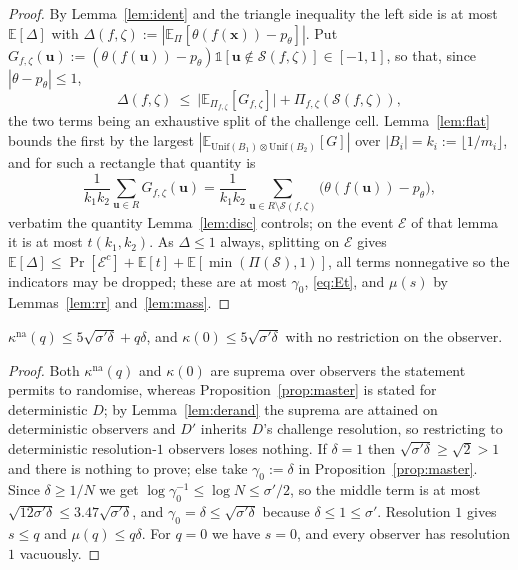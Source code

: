 \documentclass{aicr-solution}
\newcommand{\Prob}[1]{\Pr\!\left[#1\right]}
\newcommand{\Exp}{\mathbb{E}}
\newcommand{\vx}{\mathbf{x}}
\newcommand{\vu}{\mathbf{u}}
\newcommand{\ind}{\mathbb{1}}
\newcommand{\Unif}{\mathrm{Unif}}
\newcommand{\kna}{\kappa^{\mathrm{na}}}
\begin{document}
\begin{proof}
By Lemma~\ref{lem:ident} and the triangle inequality the left side is at most
$\Exp[\Delta]$ with
$\Delta(f,\zeta):=|\Exp_{\Pi}[\theta(f(\vx))-p_\theta]|$. Put
$G_{f,\zeta}(\vu):=(\theta(f(\vu))-p_\theta)\ind[\vu\notin\mathcal S(f,\zeta)]\in[-1,1]$,
so that, since $|\theta-p_\theta|\le1$,
\[
  \Delta(f,\zeta)\ \le\ \bigl|\Exp_{\Pi_{f,\zeta}}[G_{f,\zeta}]\bigr|
  +\Pi_{f,\zeta}(\mathcal S(f,\zeta)),
\]
the two terms being an exhaustive split of the challenge cell. Lemma~\ref{lem:flat}
bounds the first by the largest $|\Exp_{\Unif(B_1)\otimes\Unif(B_2)}[G]|$ over
$|B_i|=k_i:=\lfloor1/m_i\rfloor$, and for such a rectangle that quantity is
\[
  \frac{1}{k_1k_2}\sum_{\vu\in R}G_{f,\zeta}(\vu)
  =\frac{1}{k_1k_2}\sum_{\vu\in R\setminus\mathcal S(f,\zeta)}\bigl(\theta(f(\vu))-p_\theta\bigr),
\]
verbatim the quantity Lemma~\ref{lem:disc} controls; on the event $\mathcal E$ of
that lemma it is at most $t(k_1,k_2)$. As $\Delta\le1$ always, splitting on
$\mathcal E$ gives
$\Exp[\Delta]\le\Prob{\mathcal E^{c}}+\Exp[t]+\Exp[\min(\Pi(\mathcal S),1)]$, all
terms nonnegative so the indicators may be dropped; these are at most
$\gamma_0$, \eqref{eq:Et}, and $\mu(s)$ by Lemmas~\ref{lem:rr} and~\ref{lem:mass}.
\end{proof}

\begin{theorem}\label{thm:A}
$\kna(q)\le5\sqrt{\sigma'\delta}+q\delta$, and
$\kappa(0)\le5\sqrt{\sigma'\delta}$ with no restriction on the observer.
\end{theorem}

\begin{proof}
Both $\kna(q)$ and $\kappa(0)$ are suprema over observers the statement permits
to randomise, whereas Proposition~\ref{prop:master} is stated for deterministic
$D$; by Lemma~\ref{lem:derand} the suprema are attained on deterministic
observers and $D'$ inherits $D$'s challenge resolution, so restricting to
deterministic resolution-$1$ observers loses nothing. If $\delta=1$ then
$\sqrt{\sigma'\delta}\ge\sqrt2>1$ and there is nothing to prove; else take
$\gamma_0:=\delta$ in Proposition~\ref{prop:master}. Since $\delta\ge1/N$ we get
$\log\gamma_0^{-1}\le\log N\le\sigma'/2$, so the middle term is at most
$\sqrt{12\sigma'\delta}\le3.47\sqrt{\sigma'\delta}$, and
$\gamma_0=\delta\le\sqrt{\sigma'\delta}$ because $\delta\le1\le\sigma'$.
Resolution $1$ gives $s\le q$ and $\mu(q)\le q\delta$. For $q=0$ we have $s=0$, and every
observer has resolution $1$ vacuously.
\end{proof}
\end{document}
